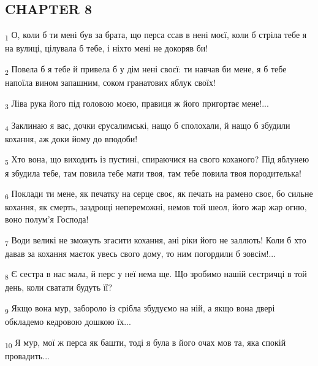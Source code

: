 \subsection{CHAPTER 8}
\begin{tcolorbox}
\textsubscript{1} О, коли б ти мені був за брата, що перса ссав в нені моєї, коли б стріла тебе я на вулиці, цілувала б тебе, і ніхто мені не докоряв би!
\end{tcolorbox}
\begin{tcolorbox}
\textsubscript{2} Повела б я тебе й привела б у дім нені своєї: ти навчав би мене, я б тебе напоїла вином запашним, соком гранатових яблук своїх!
\end{tcolorbox}
\begin{tcolorbox}
\textsubscript{3} Ліва рука його під головою моєю, правиця ж його пригортає мене!...
\end{tcolorbox}
\begin{tcolorbox}
\textsubscript{4} Заклинаю я вас, дочки єрусалимські, нащо б сполохали, й нащо б збудили кохання, аж доки йому до вподоби!
\end{tcolorbox}
\begin{tcolorbox}
\textsubscript{5} Хто вона, що виходить із пустині, спираючися на свого коханого? Під яблунею я збудила тебе, там повила тебе мати твоя, там тебе повила твоя породителька!
\end{tcolorbox}
\begin{tcolorbox}
\textsubscript{6} Поклади ти мене, як печатку на серце своє, як печать на рамено своє, бо сильне кохання, як смерть, заздрощі непереможні, немов той шеол, його жар жар огню, воно полум'я Господа!
\end{tcolorbox}
\begin{tcolorbox}
\textsubscript{7} Води великі не зможуть згасити кохання, ані ріки його не заллють! Коли б хто давав за кохання маєток увесь свого дому, то ним погордили б зовсім!...
\end{tcolorbox}
\begin{tcolorbox}
\textsubscript{8} Є сестра в нас мала, й перс у неї нема ще. Що зробимо нашій сестричці в той день, коли сватати будуть її?
\end{tcolorbox}
\begin{tcolorbox}
\textsubscript{9} Якщо вона мур, забороло із срібла збудуємо на ній, а якщо вона двері обкладемо кедровою дошкою їх...
\end{tcolorbox}
\begin{tcolorbox}
\textsubscript{10} Я мур, мої ж перса як башти, тоді я була в його очах мов та, яка спокій провадить...
\end{tcolorbox}
